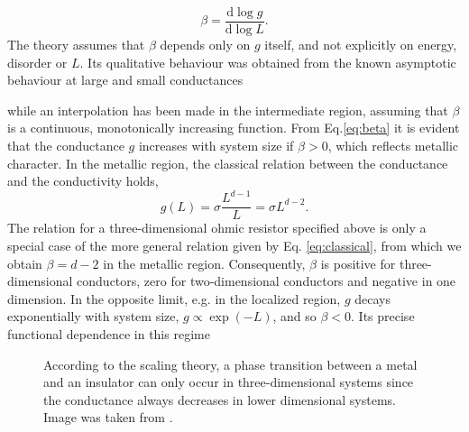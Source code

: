 \documentclass[10pt,a4paper]{article}
\begin{document}
\begin{equation}\label{eq:beta}
\beta=\frac{\mathrm{d}\log g}{\mathrm{d}\log L}.
\end{equation}
The theory assumes that $\beta$ depends only on $g$ itself, and not explicitly on energy, disorder or $L$. Its qualitative behaviour was obtained from the known asymptotic behaviour at large and small conductances
\begin{minipage}[t]{0.57\textwidth}
while an interpolation has been made in the intermediate region, assuming that $\beta$ is a continuous, monotonically increasing function. From Eq.\eqref{eq:beta} it is evident that the conductance $g$ increases with system size if $\beta>0$, which reflects metallic character. In the metallic region, the classical relation between the conductance and the conductivity holds,
\begin{equation}\label{eq:classical}
g(L)=\sigma \frac{L^{d-1}}{L}=\sigma L^{d-2}. 
\end{equation}
The relation for a three-dimensional ohmic resistor specified above is only a special case of the more general relation given by Eq. \eqref{eq:classical}, from which we obtain $\beta=d-2$ in the metallic region. Consequently, $\beta$ is positive for three-dimensional conductors, zero for two-dimensional conductors and negative in one dimension. In the opposite limit, e.g. in the localized region, $g$ decays exponentially with system size, $g \propto \exp(-L)$, and so $\beta<0$. Its precise functional dependence in this regime 
\end{minipage}\hfill
\begin{minipage}[t]{0.42\textwidth}
\begin{figure}[H]
\caption{According to the scaling theory, a phase transition between a metal and an insulator can only occur in three-dimensional systems since the conductance always decreases in lower dimensional systems. Image was taken from \cite{50yearsof}.}
\label{fig:scalingtheory} 
\end{figure}
\end{minipage}
\end{document}
